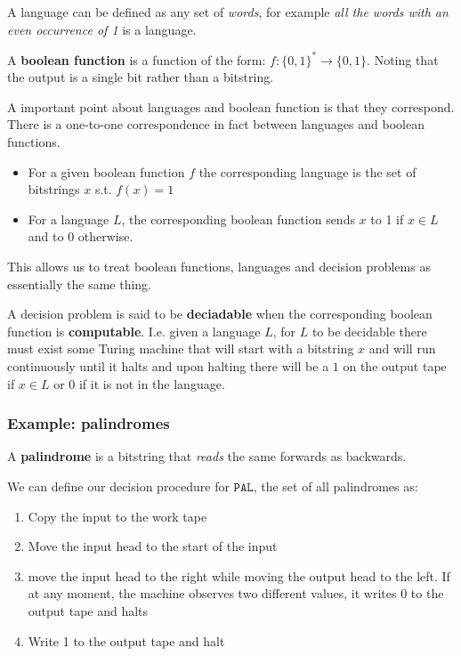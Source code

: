 \documentclass{article}
\begin{document}
A language can be defined as any set of \textit{words}, for example \textit{all the words with an even occurrence of 1} is a language.


A \textbf{boolean function} is a function of the form: $f : \{ 0,1 \}^{*} \rightarrow \{ 0,1 \} $. Noting that the output is a single bit rather than a bitstring.

A important point about languages and boolean function is that they correspond. There is a one-to-one correspondence in fact between languages and boolean functions.
\begin{itemize}
  \item For a given boolean function $f$ the corresponding language is the set of bitstrings $x$ s.t. $f(x) = 1$
  \item For a language $L$, the corresponding boolean function sends $x$ to 1 if $x \in L$ and to $0$ otherwise.
\end{itemize}

This allows us to treat boolean functions, languages and decision problems as essentially the same thing.

A decision problem is said to be \textbf{deciadable} when the corresponding boolean function is \textbf{computable}. I.e. given a language $L$, for $L$ to be decidable there must exist some Turing machine that will start with a bitstring $x$ and will run continuously until it halts and upon halting there will be a $1$ on the output tape if $x \in L$ or $0$ if it is not in the language.

\subsubsection{Example: palindromes}

A \textbf{palindrome} is a bitstring that \textit{reads} the same forwards as backwards.

We can define our decision procedure for $\texttt{PAL} $, the set of all palindromes as:

\begin{enumerate}
  \item Copy the input to the work tape
  \item Move the input head to the start of the input
  \item move the input head to the right while moving the output head to the left. If at any moment, the machine observes two different values, it writes 0 to the output tape and halts
  \item Write 1 to the output tape and halt
\end{enumerate}
\end{document}
